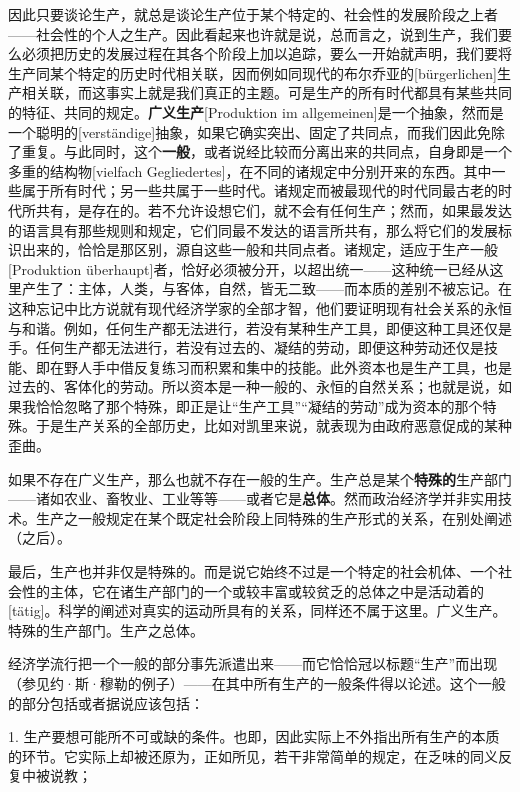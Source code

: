 \documentclass[a4paper,twoside,12pt]{ctexart}
\begin{document}
因此只要谈论生产，就总是谈论生产位于某个特定的、社会性的发展阶段之上者——社会性的个人之生产。因此看起来也许就是说，总而言之，说到生产，我们要么必须把历史的发展过程在其各个阶段上加以追踪，要么一开始就声明，我们要将生产同某个特定的历史时代相关联，因而例如同现代的布尔乔亚的[bürgerlichen]生产相关联，而这事实上就是我们真正的主题。可是生产的所有时代都具有某些共同的特征、共同的规定。\textbf{广义生产}[Produktion im allgemeinen]是一个抽象，然而是一个聪明的[verständige]抽象，如果它确实突出、固定了共同点，而我们因此免除了重复。与此同时，这个\textbf{一般}，或者说经比较而分离出来的共同点，自身即是一个多重的结构物[vielfach Gegliedertes]，在不同的诸规定中分别开来的东西。其中一些属于所有时代；另一些共属于一些时代。诸规定而被最现代的时代同最古老的时代所共有，是存在的。若不允许设想它们，就不会有任何生产；然而，如果最发达的语言具有那些规则和规定，它们同最不发达的语言所共有，那么将它们的发展标识出来的，恰恰是那区别，源自这些一般和共同点者。诸规定，适应于生产一般[Produktion überhaupt]者，恰好必须被分开，以超出统一——这种统一已经从这里产生了：主体，人类，与客体，自然，皆无二致——而本质的差别不被忘记。在这种忘记中比方说就有现代经济学家的全部才智，他们要证明现有社会关系的永恒与和谐。例如，任何生产都无法进行，若没有某种生产工具，即便这种工具还仅是手。任何生产都无法进行，若没有过去的、凝结的劳动，即便这种劳动还仅是技能、即在野人手中借反复练习而积累和集中的技能。此外资本也是生产工具，也是过去的、客体化的劳动。所以资本是一种一般的、永恒的自然关系；也就是说，如果我恰恰忽略了那个特殊，即正是让“生产工具”“凝结的劳动”成为资本的那个特殊。于是生产关系的全部历史，比如对凯里来说，就表现为由政府恶意促成的某种歪曲。

如果不存在广义生产，那么也就不存在一般的生产。生产总是某个\textbf{特殊的}生产部门——诸如农业、畜牧业、工业等等——或者它是\textbf{总体}。然而政治经济学并非实用技术。生产之一般规定在某个既定社会阶段上同特殊的生产形式的关系，在别处阐述（之后）。

最后，生产也并非仅是特殊的。而是说它始终不过是一个特定的社会机体、一个社会性的主体，它在诸生产部门的一个或较丰富或较贫乏的总体之中是活动着的[tätig]。科学的阐述对真实的运动所具有的关系，同样还不属于这里。广义生产。特殊的生产部门。生产之总体。

经济学流行把一个一般的部分事先派遣出来——而它恰恰冠以标题“生产”而出现（参见约·斯·穆勒的例子）——在其中所有生产的一般条件得以论述。这个一般的部分包括或者据说应该包括：

1. 生产要想可能所不可或缺的条件。也即，因此实际上不外指出所有生产的本质的环节。它实际上却被还原为，正如所见，若干非常简单的规定，在乏味的同义反复中被说教；
\end{document}
